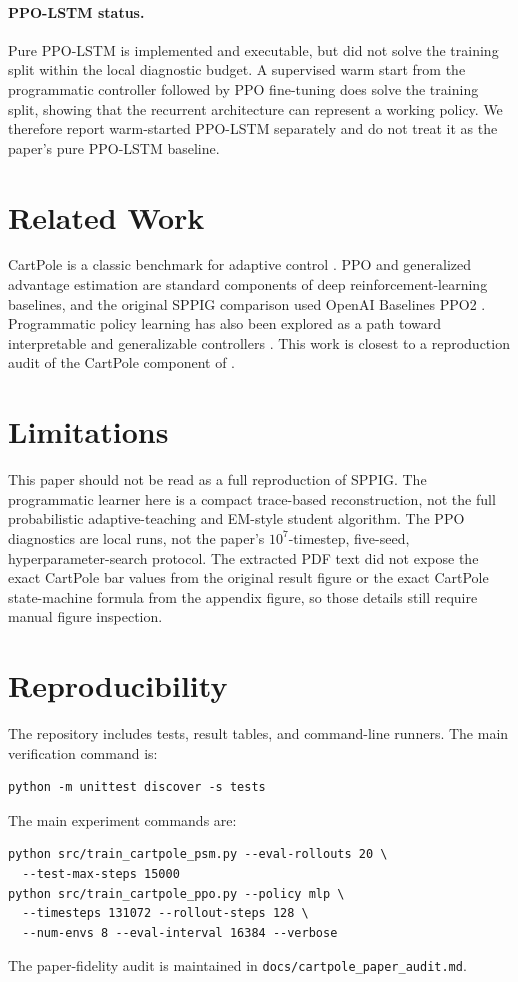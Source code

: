 \documentclass[letterpaper,twocolumn,10pt]{article}
\begin{document}
\paragraph{PPO-LSTM status.}
Pure PPO-LSTM is implemented and executable, but did not solve the training
split within the local diagnostic budget.  A supervised warm start from the
programmatic controller followed by PPO fine-tuning does solve the training
split, showing that the recurrent architecture can represent a working policy.
We therefore report warm-started PPO-LSTM separately and do not treat it as the
paper's pure PPO-LSTM baseline.

\section{Related Work}

CartPole is a classic benchmark for adaptive control \citep{barto1983cartpole}.
PPO \citep{schulman2017ppo} and generalized advantage estimation
\citep{schulman2015gae} are standard components of deep reinforcement-learning
baselines, and the original SPPIG comparison used OpenAI Baselines PPO2
\citep{baselines}.  Programmatic policy learning has also been explored as a
path toward interpretable and generalizable controllers
\citep{trivedi2021programs}.  This work is closest to a reproduction audit of
the CartPole component of \citet{inala2020sppig}.

\section{Limitations}

This paper should not be read as a full reproduction of SPPIG.  The
programmatic learner here is a compact trace-based reconstruction, not the full
probabilistic adaptive-teaching and EM-style student algorithm.  The PPO
diagnostics are local runs, not the paper's $10^7$-timestep, five-seed,
hyperparameter-search protocol.  The extracted PDF text did not expose the
exact CartPole bar values from the original result figure or the exact
CartPole state-machine formula from the appendix figure, so those details
still require manual figure inspection.

\section{Reproducibility}

The repository includes tests, result tables, and command-line runners.  The
main verification command is:
\begin{verbatim}
python -m unittest discover -s tests
\end{verbatim}
The main experiment commands are:
\begin{verbatim}
python src/train_cartpole_psm.py --eval-rollouts 20 \
  --test-max-steps 15000
python src/train_cartpole_ppo.py --policy mlp \
  --timesteps 131072 --rollout-steps 128 \
  --num-envs 8 --eval-interval 16384 --verbose
\end{verbatim}
The paper-fidelity audit is maintained in
\texttt{docs/cartpole\_paper\_audit.md}.
\end{document}
